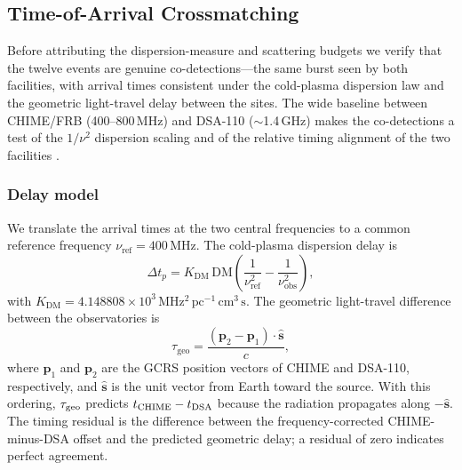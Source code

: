\subsection{Time-of-Arrival Crossmatching}
\label{sec:toa}

Before attributing the dispersion-measure and scattering budgets we verify that the
twelve events are genuine co-detections---the same burst seen by both
facilities, with arrival times consistent under the cold-plasma dispersion law
and the geometric light-travel delay between the sites. The wide baseline
between CHIME/FRB (400--800\,MHz) and DSA-110 ($\sim$1.4\,GHz) makes the
co-detections a test of the $1/\nu^2$ dispersion scaling and of the relative
timing alignment of the two facilities \citep{Lorimer2007, Thornton2013}.

\subsubsection{Delay model}

We translate the arrival times at the two central frequencies to a common
reference frequency $\nu_{\mathrm{ref}}=400$\,MHz. The cold-plasma dispersion
delay is
\begin{equation}
\Delta t_p = K_{\mathrm{DM}}\,\mathrm{DM}
\left(\frac{1}{\nu_{\mathrm{ref}}^2}-\frac{1}{\nu_{\mathrm{obs}}^2}\right),
\label{eq:dmdelay}
\end{equation}
with $K_{\mathrm{DM}} = 4.148808\times10^{3}\,\mathrm{MHz^2\,pc^{-1}\,cm^3\,s}$.
The geometric light-travel difference between the observatories is
\begin{equation}
\tau_{\mathrm{geo}} = \frac{(\mathbf{p}_2-\mathbf{p}_1)\cdot\hat{\mathbf{s}}}{c},
\label{eq:geodelay}
\end{equation}
where $\mathbf{p}_1$ and $\mathbf{p}_2$ are the GCRS position vectors of CHIME
and DSA-110, respectively, and $\hat{\mathbf{s}}$ is the unit vector from Earth
toward the source. With this ordering, $\tau_{\rm geo}$ predicts
$t_{\rm CHIME}-t_{\rm DSA}$ because the radiation propagates along
$-\hat{\mathbf{s}}$. The timing residual is the difference between the
frequency-corrected CHIME-minus-DSA offset and the predicted geometric delay; a
residual of zero indicates perfect agreement.


